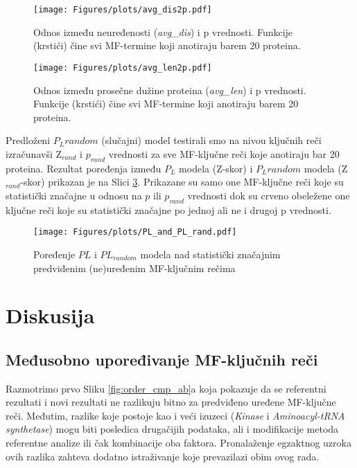\begin{figure}[th]
  \centering
\texttt{[image: Figures/plots/avg\_dis2p.pdf]}
\caption {
  Odnos između neuređenosti (\textit{avg\_dis}) i p vrednosti.
  Funkcije (krstići) čine svi MF-termine koji anotiraju barem 20 proteina.
}
\label{fig:avg_dis_vs_p}
\end{figure}

\begin{figure}[th]
  \centering
\texttt{[image: Figures/plots/avg\_len2p.pdf]}
\caption {
  Odnos između prosečne dužine proteina (\textit{avg\_len}) i p vrednosti.
  Funkcije (krstići) čine svi MF-termine koji anotiraju barem 20 proteina.
}
\label{fig:avg_len_vs_p}
\end{figure}



Predloženi $P_L random$ (slučajni) model testirali smo na nivou ključnih reči
izračunavši Z$_{rand}$ i  $p_{rand}$ vrednosti za sve MF-ključne reči koje
anotiraju bar 20 proteina. Rezultat poređenja između $P_L$
modela (Z-skor) i $P_L random$ modela (Z$_{rand}$-skor) prikazan je na Slici
\ref{fig:PLrand}. Prikazane su samo one MF-ključne reči koje su statistički
značajne u odnosu na $p$ ili $p_{rand}$ vrednosti dok su crveno obeležene one
ključne reči koje su statistički značajne po jednoj ali ne i drugoj p
vrednosti.


\begin{figure}[th]
\hspace*{-2.7cm} 
\centering
\texttt{[image: Figures/plots/PL\_and\_PL\_rand.pdf]}
\caption {
  Poređenje $PL$ i $PL_{random}$ modela nad statistički značajnim predviđenim (ne)uređenim MF-ključnim rečima
}
\label{fig:PLrand}
\end{figure}




\chapter{Diskusija} %

\label{Diskusija} %

\section{Međusobno upoređivanje MF-ključnih reči}

Razmotrimo prvo Sliku \ref{fig:order_cmp_ab}a koja pokazuje da se referentni
rezultati i novi rezultati ne razlikuju bitno za predviđeno uređene MF-ključne
reči. Međutim, razlike koje postoje kao i veći izuzeci (\textit{Kinase} i
\textit{Aminoacyl-tRNA synthetase})  mogu biti posledica drugačijih podataka,
ali i modifikacije metoda referentne analize ili čak kombinacije oba faktora.
Pronalaženje egzaktnog uzroka ovih razlika zahteva dodatno istraživanje koje
prevazilazi obim ovog rada.

